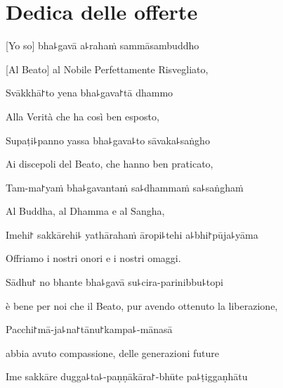 \chapter*{Dedica delle offerte}

\delegateSetUseNext

[Yo so] bha꜕gavā a꜕rahaṁ sammāsambuddho\\

\begin{english}
[Al Beato] al Nobile Perfettamente Risvegliato,
\end{english}

Svākkhā꜓to yena bha꜕gava꜓tā dhammo\\

\begin{english}
Alla Verità che ha così ben esposto,
\end{english}


Supaṭi꜕panno yassa bha꜕gava꜕to sāvaka꜕saṅgho\\

\begin{english}
Ai discepoli del Beato, che hanno ben praticato,
\end{english}


Tam-ma꜓yaṁ bha꜕gavantaṁ sa꜕dhammaṁ sa꜕saṅghaṁ\\

\begin{english}
Al Buddha, al Dhamma e al Sangha,
\end{english}


Imehi꜓ sakkārehi꜕ yathārahaṁ āropi꜕tehi a꜕bhi꜓pūja꜕yāma\\

\begin{english}
Offriamo i nostri onori e i nostri omaggi.
\end{english}


Sādhu꜓ no bhante bha꜕gavā su꜕cira-parinibbu꜕topi\\

\begin{english}
è bene per noi che il Beato, pur avendo ottenuto la liberazione,
\end{english}


Pacchi꜓mā-ja꜕na꜓tānu꜓kampa꜕-mānasā\\

\begin{english}
abbia avuto compassione, delle generazioni future
\end{english}


Ime sakkāre dugga꜕ta꜕-paṇṇākāra꜓-bhūte pa꜕ṭiggaṇhātu\\

